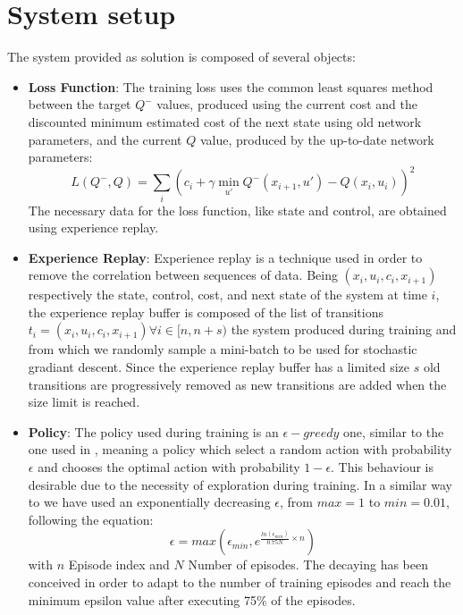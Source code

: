 \documentclass[twocolumn, a4paper]{article}
\begin{document}
\section{System setup}
The system provided as solution is composed of several objects:
\begin{itemize}
	\item \textbf{Loss Function}: The training loss uses the common least
		  squares method between the target \(Q^{-}\) values, produced using
		  the current cost and the discounted minimum estimated cost of the
		  next state using old network parameters, and the current \(Q\) value,
		  produced by the up-to-date network parameters:
		  \[L(Q^{-},Q)=\sum_{i}(c_{i}+\gamma\min_{u'}Q^{-}(x_{i+1},u')-Q(x_{i},
		  u_{i}))^{2}\]
		  The necessary data for the loss function, like state
		  and control, are obtained using experience replay.
	\item \textbf{Experience Replay}: Experience replay is a technique used in
		  order to remove the correlation between sequences of data. Being
		  \((x_{i}, u_{i}, c_{i}, x_{i+1})\) respectively the state, control,
		  cost, and next state of the system at time \(i\), the experience
		  replay buffer is composed of the list of transitions
		  \({t_{i}=(x_{i}, u_{i}, c_{i}, x_{i+1}) \forall i\in [n, n+s)}\)
		  the system produced during training and from which we randomly
		  sample a mini-batch to be used for stochastic gradiant descent.
		  Since the experience replay buffer has a limited size
		  \(s%
		  \) old transitions are progressively removed as
		  new transitions are added when the size limit is reached.
	\item \textbf{Policy}: The policy used during training is an
		  \(\epsilon-greedy\) one, similar to the one used in \cite{Mnih},
		  meaning a policy which select a random action with probability
		  \(\epsilon\) and chooses the optimal action with probability
		  \(1-\epsilon\). This behaviour is desirable due to the necessity of
		  exploration during training. In a similar way to \cite{Mnih} we have
		  used an exponentially decreasing \(\epsilon\), from \(max=1\) to
		  \(min=0.01\), following the equation:
		  \[
		  	\epsilon=max(\epsilon_{min}, e^{\frac{ln(\epsilon_{min})}{0.75N}\times n})
		  \]
		  with $n$ Episode index and $N$ Number of episodes.
		  The decaying has been conceived in order to adapt to the number of
		  training episodes and reach the minimum epsilon value after executing
		  75\% of the episodes.
\end{itemize}
\end{document}
